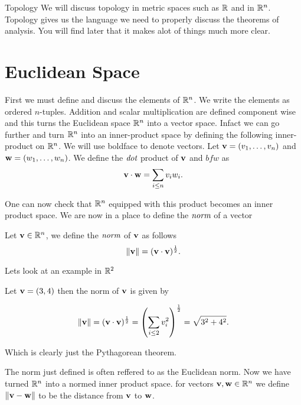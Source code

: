 \begin{chapter}{Topology}
    We will discuss topology in metric spaces such as $\mathbb{R}$ and in $\mathbb{R}^n$. Topology gives us the language we need to properly discuss the theorems of analysis. You will 
    find later that it makes alot of things much more clear. 


    \section{Euclidean Space}
    First we must define and discuss the elements of $\mathbb{R}^n$. We write the elements as ordered $n$-tuples. Addition and scalar multiplication are defined component wise and this turns 
    the Euclidean space $\mathbb{R}^n$ into a vector space. Infact we can go further and turn $\mathbb{R}^n$ into an inner-product space by defining the following inner-product on $\mathbb{R}^n$. 
    We will use boldface to denote vectors. Let $\mathbf{v} = (v_1, \dots, v_n) $ and $\mathbf{w} = (w_1, \dots , w_n)$. We define the $\emph{dot}$ product of $\mathbf{v} $ and $bfw$ as 
    \begin{equation} 
        \mathbf{v} \cdot \mathbf{w} = \sum_{i \leq n} v_iw_i.
    \end{equation} 

    One can now check that $\mathbb{R}^{n} $ equipped with this product becomes an inner product space. We are now in a place to define the $\emph{norm}$ of a vector 

    \begin{defn}
        Let $\mathbf{v} \in \mathbb{R}^{n}$, we define the $\emph{norm}$ of $\mathbf{v}$ as follows  
        \[\norm{\bfv} = (\bfv \cdot \bfv)^{\frac{1}{2}}.\]
    \end{defn}

    Lets look at an example in $\mathbb{R}^2$
    \begin{ex}
        Let $\mathbf{v} = (3, 4)$ then the norm of $\mathbf{v}$ is given by 

        \[\norm{\bfv} = (\bfv \cdot \bfv)^{\frac{1}{2}} = \left(\sum_{i \leq 2}v^2_i\right)^{\frac{1}{2}} = \sqrt{3^2 + 4^2}.\]

        Which is clearly just the Pythagorean theorem. 
    \end{ex}

    The norm just defined is often reffered to as the Euclidean norm. Now we have turned $\mathbb{R}^{n}$ into a normed inner product space. 
    for vectors $\mathbf{v}, \mathbf{w} \in \mathbb{R}^{n}$ we define $\| \mathbf{v} - \mathbf{w} \| $ to be the distance from $\mathbf{v} $ to $\mathbf{w}$. 
    

\end{chapter}
